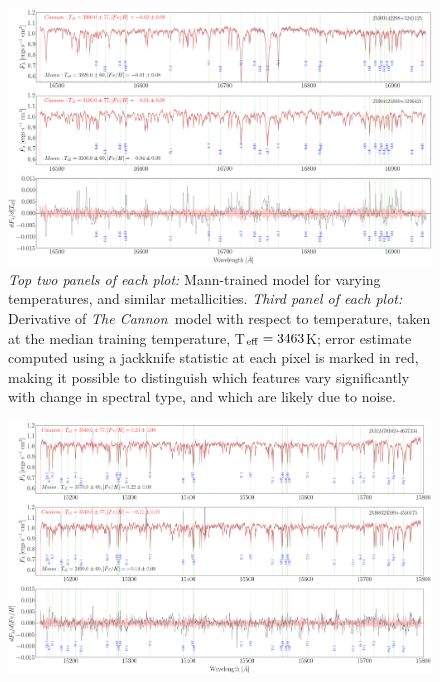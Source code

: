 \documentclass[twocolumn]{aastex62}
\newcommand{\thecannon}{\textsl{The Cannon}}
\newcommand{\cannon}{\textsl{Cannon}}
\begin{document}
\begin{figure}
	\begin{center}
	\includegraphics[width=16cm]{demo_derivatives_teff3.png}
	\end{center}
	\caption{\textit{Top two panels of each plot:} \color{red}{\bf APOGEE spectra (black), overlaid by the }\color{black} Mann-trained \color{red}{\bf \cannon\ }\color{black} model for \color{red}{\bf two sources of }\color{black} varying temperatures, and similar metallicities. \textit{Third panel of each plot:} Derivative of \thecannon\ model with respect to temperature, taken at the median training temperature, T$_{\rm eff}=3463$K; error estimate computed using a jackknife statistic at each pixel is marked in red, making it possible to distinguish which features vary significantly with change in spectral type, and which are likely due to noise.}
	\label{fig:demo_teff}
\end{figure}

\begin{figure}
	\begin{center}
	\includegraphics[width=16cm]{demo_derivatives_feh1.png}
	\end{center}
\end{figure}
\end{document}
